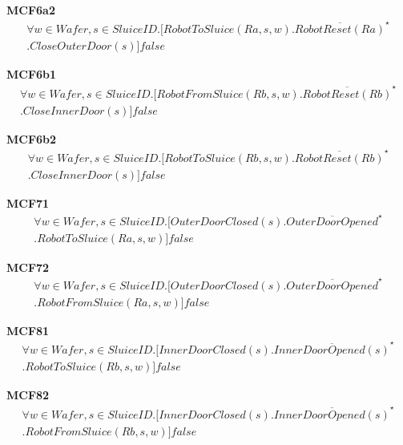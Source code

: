 \documentclass[12pt]{report}
\begin{document}
    \textbf{MCF6a2}
    \begin{multline*}
        [true^{\star}] \forall w \in Wafer, s \in SluiceID.[RobotToSluice(Ra,s,w).\overline{RobotReset(Ra)}^{\star} \\
        .CloseOuterDoor(s)]false
    \end{multline*}
	
    \textbf{MCF6b1}
    \begin{multline*}
        [true^{\star}] \forall w \in Wafer, s \in SluiceID.[RobotFromSluice(Rb,s,w).\overline{RobotReset(Rb)}^{\star}\\
        .CloseInnerDoor(s)]false
    \end{multline*}

    \textbf{MCF6b2}
    \begin{multline*}
        [true^{\star}] \forall w \in Wafer, s \in SluiceID.[RobotToSluice(Rb,s,w).\overline{RobotReset(Rb)}^{\star} \\
        .CloseInnerDoor(s)]false
    \end{multline*}

    \textbf{MCF71}
    \begin{multline*}
        [true^{\star}] \forall w \in Wafer, s \in SluiceID.[OuterDoorClosed(s).\overline{OuterDoorOpened}^{\star} \\
        .RobotToSluice(Ra,s,w)]false
    \end{multline*}

    \textbf{MCF72}
    \begin{multline*}
        [true^{\star}] \forall w \in Wafer, s \in SluiceID.[OuterDoorClosed(s).\overline{OuterDoorOpened}^{\star} \\
        .RobotFromSluice(Ra,s,w)]false
    \end{multline*}

    \textbf{MCF81}
    \begin{multline*}
        [true^{\star}] \forall w \in Wafer, s \in SluiceID.[InnerDoorClosed(s).\overline{InnerDoorOpened(s)}^{\star} \\
        .RobotToSluice(Rb, s, w)]false
    \end{multline*}

    \textbf{MCF82}
    \begin{multline*}
        [true^{\star}] \forall w \in Wafer, s \in SluiceID.[InnerDoorClosed(s).\overline{InnerDoorOpened(s)}^{\star} \\
        .RobotFromSluice(Rb, s, w)]false
    \end{multline*}
\end{document}

